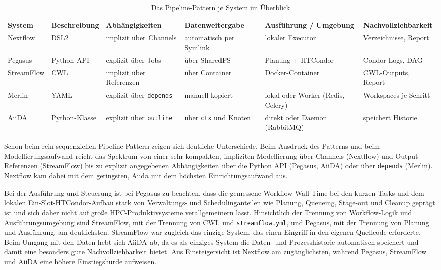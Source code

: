 \begin{table}[ht]
  \caption{Das Pipeline-Pattern je System im Überblick}
  \label{tab:pipeline:composition}
  \centering
  \footnotesize
  \setlength{\tabcolsep}{3pt}
  \renewcommand{\arraystretch}{1.3}
  \begin{tabular}{l p{1.5cm} p{2.0cm} p{2.0cm} p{2.5cm} p{2.2cm}}
    \hline
    \textbf{System} & \textbf{Beschrei\-bung} & \textbf{Abhängig\-keiten} & \textbf{Daten\-weitergabe} & \textbf{Ausführung / Umgebung} & \textbf{Nachvoll\-ziehbarkeit} \\
    \hline
    Nextflow
      & DSL2
      & implizit über Channels
      & auto\-matisch per Symlink
      & lokaler Executor
      & Verzeich\-nisse, Report \\
    Pegasus
      & Python API
      & explizit über Jobs
      & über SharedFS
      & Planung + HTCondor
      & Condor-Logs, DAG \\
    StreamFlow
      & CWL
      & implizit über Referenzen
      & über Container
      & Docker-Container
      & CWL-Outputs, Report \\
    Merlin
      & YAML
      & explizit über \texttt{depends}
      & manuell kopiert
      & lokal oder Worker (Redis, Celery)
      & Work\-spaces je Schritt \\
    AiiDA
      & Python-Klasse
      & explizit über \texttt{outline}
      & über \texttt{ctx} und Knoten
      & direkt oder Daemon (RabbitMQ)
      & speichert Historie \\
    \hline
  \end{tabular}
\end{table}

Schon beim rein sequenziellen Pipeline-Pattern zeigen sich deutliche Unterschiede. Beim Ausdruck
des Patterns und beim Modellierungsaufwand reicht das Spektrum von einer sehr kompakten,
impliziten Modellierung über Channels (Nextflow) und Output-Referenzen (StreamFlow) bis zu
explizit angegebenen Abhängigkeiten über die Python API (Pegasus, AiiDA) oder über \texttt{depends}
(Merlin). Nextflow kam dabei mit dem geringsten, Aiida mit dem höchsten Einrichtungsaufwand aus.

Bei der Ausführung und Steuerung ist bei Pegasus zu beachten, dass die gemessene
Workflow-Wall-Time bei den kurzen Tasks und dem lokalen Ein-Slot-HTCondor-Aufbau stark von
Verwaltungs- und Schedulinganteilen wie Planung, Queueing, Stage-out und Cleanup geprägt ist und
sich daher nicht auf große HPC-Produktivsysteme verallgemeinern lässt. Hinsichtlich der Trennung
von Workflow-Logik und Ausführungsumgebung sind StreamFlow, mit der Trennung von CWL und
\texttt{streamflow.yml}, und Pegasus, mit der Trennung von Planung und Ausführung, am deutlichsten.
StreamFlow war zugleich das einzige System, das einen Eingriff in den eigenen Quellcode erforderte.
Beim Umgang mit den Daten hebt sich AiiDA ab, da es als einziges System die Daten- und
Prozesshistorie automatisch speichert und damit eine besonders gute Nachvollziehbarkeit bietet.
Aus Einsteigersicht ist Nextflow am zugänglichsten, während Pegasus, StreamFlow und AiiDA eine
höhere Einstiegshürde aufweisen.

